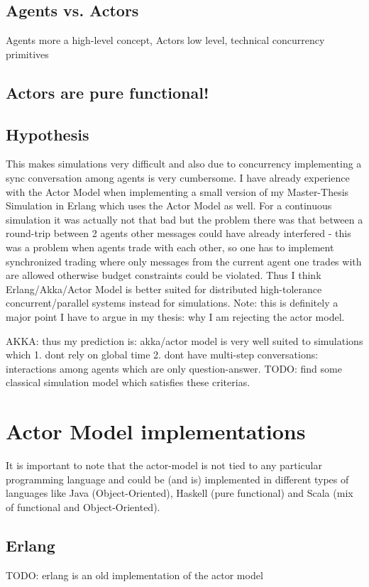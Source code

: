 \documentclass{article}
\begin{document}
\subsection{Agents vs. Actors}
Agents more a high-level concept, Actors low level, technical concurrency primitives

\subsection{Actors are pure functional!}

\subsection{Hypothesis}
This makes simulations very difficult and also due to concurrency implementing a sync conversation among agents is very cumbersome. I have already experience with the Actor Model when implementing a small version of my Master-Thesis Simulation in Erlang which uses the Actor Model as well. For a continuous simulation it was actually not that bad but the problem there was that between a round-trip between 2 agents other messages could have already interfered - this was a problem when agents trade with each other, so one has to implement synchronized trading where only messages from the current agent one trades with are allowed otherwise budget constraints could be violated. Thus I think Erlang/Akka/Actor Model is better suited for distributed high-tolerance concurrent/parallel systems instead for simulations. Note: this is definitely a major point I have to argue in my thesis: why I am rejecting the actor model.

AKKA: thus my prediction is: akka/actor model is very well suited to simulations which 1. dont rely on global time 2. dont have multi-step conversations: interactions among agents which are only question-answer. TODO: find some classical simulation model which satisfies these criterias.

\section{Actor Model implementations}
It is important to note that the actor-model is not tied to any particular programming language and could be (and is) implemented in different types of languages like Java (Object-Oriented), Haskell (pure functional) and Scala (mix of functional and Object-Oriented).

\subsection{Erlang}
TODO: erlang is an old implementation of the actor model
\end{document}
